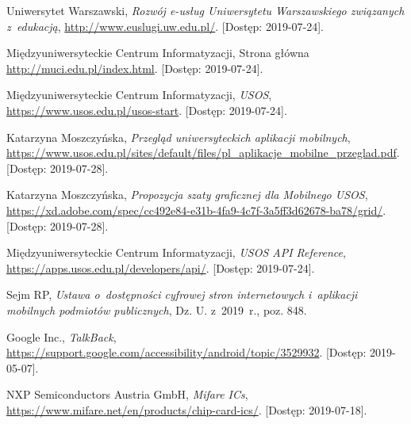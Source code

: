 \documentclass{pracamgr}
\begin{document}
\appendix

\cleardoublepage
{}
{}
\listoffigures

\cleardoublepage
{}
{}
\listoftables


\begin{thebibliography}{99}


 Uniwersytet Warszawski,
\textit{Rozwój e-usług Uniwersytetu Warszawskiego związanych z~edukacją},
\url{http://www.euslugi.uw.edu.pl/}. [Dostęp: 2019-07-24].

 Międzyuniwersyteckie Centrum Informatyzacji, Strona główna
\url{http://muci.edu.pl/index.html}. [Dostęp: 2019-07-24].

 Międzyuniwersyteckie Centrum Informatyzacji, \textit{USOS},
\url{https://www.usos.edu.pl/usos-start}. [Dostęp: 2019-07-24].

  Katarzyna Moszczyńska, \textit{Przegląd uniwersyteckich aplikacji mobilnych},
\url{https://www.usos.edu.pl/sites/default/files/pl_aplikacje_mobilne_przeglad.pdf}. [Dostęp: 2019-07-28].

  Katarzyna Moszczyńska, \textit{Propozycja szaty graficznej dla Mobilnego USOS},
\url{https://xd.adobe.com/spec/cc492e84-e31b-4fa9-4c7f-3a5ff3d62678-ba78/grid/}. [Dostęp: 2019-07-28].

 Międzyuniwersyteckie Centrum Informatyzacji, \textit{USOS API Reference},
\url{https://apps.usos.edu.pl/developers/api/}. [Dostęp: 2019-07-24].

 Sejm RP, \textit{Ustawa o~dostępności cyfrowej stron internetowych i~aplikacji mobilnych podmiotów publicznych}, Dz. U. z~2019~r., poz. 848.

 Google Inc., \textit{TalkBack}, \url{https://support.google.com/accessibility/android/topic/3529932}. [Dostęp: 2019-05-07].

 NXP Semiconductors Austria GmbH, \textit{Mifare ICs}, \url{https://www.mifare.net/en/products/chip-card-ics/}. [Dostęp: 2019-07-18].


\end{thebibliography}
\end{document}
